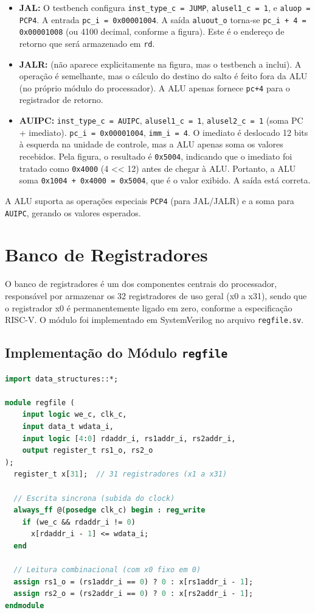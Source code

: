 \documentclass[
	12pt,				%
	oneside,
	a4paper,			%
	english,			%
	french,				%
	spanish,			%
	brazil,				%
	]{abntex2}
\begin{document}
\begin{itemize}
\item \textbf{JAL:} O testbench configura \texttt{inst\_type\_c = JUMP}, \texttt{alusel1\_c = 1}, e \texttt{aluop = PCP4}. A entrada \texttt{pc\_i = 0x00001004}. A saída \texttt{aluout\_o} torna‑se \texttt{pc\_i + 4 = 0x00001008} (ou 4100 decimal, conforme a figura). Este é o endereço de retorno que será armazenado em \texttt{rd}.
\item \textbf{JALR:} (não aparece explicitamente na figura, mas o testbench a inclui). A operação é semelhante, mas o cálculo do destino do salto é feito fora da ALU (no próprio módulo do processador). A ALU apenas fornece \texttt{pc+4} para o registrador de retorno.
\item \textbf{AUIPC:} \texttt{inst\_type\_c = AUIPC}, \texttt{alusel1\_c = 1}, \texttt{alusel2\_c = 1} (soma PC + imediato). \texttt{pc\_i = 0x00001004}, \texttt{imm\_i = 4}. O imediato é deslocado 12 bits à esquerda na unidade de controle, mas a ALU apenas soma os valores recebidos. Pela figura, o resultado é \texttt{0x5004}, indicando que o imediato foi tratado como \texttt{0x4000} (4 << 12) antes de chegar à ALU. Portanto, a ALU soma \texttt{0x1004 + 0x4000 = 0x5004}, que é o valor exibido. A saída está correta.
\end{itemize}

 A ALU suporta as operações especiais \texttt{PCP4} (para JAL/JALR) e a soma para \texttt{AUIPC}, gerando os valores esperados.

\section{Banco de Registradores}

O banco de registradores é um dos componentes centrais do processador, responsável por armazenar os 32 registradores de uso geral (x0 a x31), sendo que o registrador x0 é permanentemente ligado em zero, conforme a especificação RISC-V. O módulo foi implementado em SystemVerilog no arquivo \texttt{regfile.sv}.

\subsection{Implementação do Módulo \texttt{regfile}}

\begin{lstlisting}[language=SystemVerilog, caption={Módulo regfile.sv}, label={lst:regfile}]
import data_structures::*;

module regfile (
    input logic we_c, clk_c,
    input data_t wdata_i,
    input logic [4:0] rdaddr_i, rs1addr_i, rs2addr_i,
    output register_t rs1_o, rs2_o
);
  register_t x[31];  // 31 registradores (x1 a x31)

  // Escrita sincrona (subida do clock)
  always_ff @(posedge clk_c) begin : reg_write
    if (we_c && rdaddr_i != 0)
      x[rdaddr_i - 1] <= wdata_i;
  end

  // Leitura combinacional (com x0 fixo em 0)
  assign rs1_o = (rs1addr_i == 0) ? 0 : x[rs1addr_i - 1];
  assign rs2_o = (rs2addr_i == 0) ? 0 : x[rs2addr_i - 1];
endmodule
\end{lstlisting}
\end{document}
